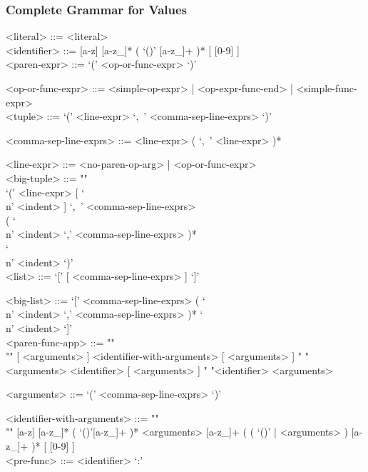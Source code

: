 \documentclass{article}
\begin{document}
\subsubsection{Complete Grammar for Values}
\begin{grammar}

<literal> ::= <literal> \\

<identifier> ::= [a-z] [a-z_]* ( `()' [a-z_]+ )* [ [0-9] ] \\

<paren-expr> ::= `(' <op-or-func-expr> `)'  

<op-or-func-expr> ::=
<simple-op-expr> | <op-expr-func-end> | <simple-func-expr>  \\

<tuple> ::= `(' <line-expr> `,\ ' <comma-sep-line-exprs> `)'

<comma-sep-line-exprs> ::= <line-expr> ( `,\ ' <line-expr> )*

<line-expr> ::= <no-paren-op-arg> | <op-or-func-expr> \\

<big-tuple> ::= ""\\
`(' <line-expr> [ `\\n' <indent> ] `,\ ' <comma-sep-line-exprs> \\
( `\\n' <indent> `,' <comma-sep-line-exprs> )* \\
`\\n' <indent> `)' \\

<list> ::= `[' [ <comma-sep-line-exprs> ] `]'

<big-list> ::= 
`[' <comma-sep-line-exprs>
( `\\n' <indent> `,' <comma-sep-line-exprs> )*
`\\n' <indent> `]' \\

<paren-func-app> ::= ""\\""
[ <arguments> ] <identifier-with-arguments> [ <arguments> ]
\alt " "<arguments> <identifier> [ <arguments> ]
\alt " "<identifier> <arguments>

<arguments> ::= `(' <comma-sep-line-exprs> `)'

<identifier-with-arguments> ::= ""\\""
[a-z] [a-z_]* ( `()'[a-z_]+ )* <arguments>
[a-z_]+ ( ( `()' | <arguments> ) [a-z_]+ )* 
[ [0-9] ] \\

<pre-func> ::= <identifier> `:'


\end{grammar}
\end{document}
